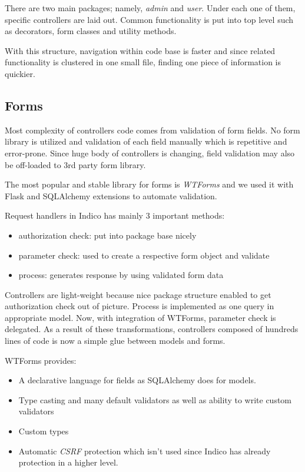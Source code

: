 There are two main packages; namely, \textit{admin} and \textit{user}. Under each one of them, specific controllers are laid out. Common functionality is put into top level such as decorators, form classes and utility methods.

With this structure, navigation within code base is faster and since related functionality is clustered in one small file, finding one piece of information is quickier.

\subsection{Forms}

Most complexity of controllers code comes from validation of form fields. No form library is utilized and validation of each field manually which is repetitive and error-prone. Since huge body of controllers is changing, field validation may also be off-loaded to 3rd party form library.

The most popular and stable library for forms is \textit{WTForms} and we used it with Flask and SQLAlchemy extensions to automate validation.

Request handlers in Indico has mainly 3 important methods:
\begin{itemize}
  \item authorization check: put into package base nicely
  \item parameter check: used to create a respective form object and validate
  \item process: generates response by using validated form data
\end{itemize}

Controllers are light-weight because nice package structure enabled to get authorization check out of picture. Process is implemented as one query in appropriate model. Now, with integration of WTForms, parameter check is delegated. As a result of these transformations, controllers composed of hundreds lines of code is now a simple glue between models and forms.

WTForms provides:
\begin{itemize}
  \item A declarative language for fields as SQLAlchemy does for models.
  \item Type casting and many default validators as well as ability to write custom validators
  \item Custom types
  \item Automatic \textit{CSRF} protection which isn't used since Indico has already protection in a higher level.
\end{itemize}

